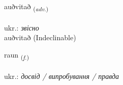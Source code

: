\documentclass[frontgrid, backgrid]{flacards}\usepackage[]{graphicx}\usepackage[]{xcolor}
\begin{document}

\renewcommand{\flhead}{\vskip5pt \fboxsep=0pt {\small\bfseries\footnotesize Atviksorð | прислівник}}
\renewcommand{\fcfoot}{\vskip5pt \fboxsep=0pt \hspace{2pt}{\small\bfseries\footnotesize 1K}}

\renewcommand{\blhead}{\vskip5pt {\small\bfseries\footnotesize Atviksorð | прислівник }}
\renewcommand{\bcfoot}{\vskip5pt \hspace{2pt}{\small\bfseries\footnotesize 1K}}


{auðvitað \small{\textsubscript{(\textit{adv.})}} \\[1ex]
\textphonetic{[œiðvɪtað]} \\
ukr.: \emph{звісно} \\  [2ex]
auðvitað (Indeclinable)}

\renewcommand{\flhead}{\vskip5pt \fboxsep=0pt {\small\bfseries\footnotesize Nafnorð | іменник}}
\renewcommand{\fcfoot}{\vskip5pt \fboxsep=0pt \hspace{2pt}{\small\bfseries\footnotesize 1K}}

\renewcommand{\blhead}{\vskip5pt {\small\bfseries\footnotesize Nafnorð | іменник }}
\renewcommand{\bcfoot}{\vskip5pt \hspace{2pt}{\small\bfseries\footnotesize 1K}}


{raun \small{\textsubscript{(\textit{f.})}} \\[1ex] %
\textphonetic{[rœiːn]} \\
ukr.: \emph{досвід / випробування / правда} \\  [2ex]
\renewcommand*{\arraystretch}{0.8}
}

\renewcommand{\flhead}{\vskip5pt \fboxsep=0pt {\small\bfseries\footnotesize Nafnorð | іменник}}
\renewcommand{\fcfoot}{\vskip5pt \fboxsep=0pt \hspace{2pt}{\small\bfseries\footnotesize 1K}}
\end{document}
